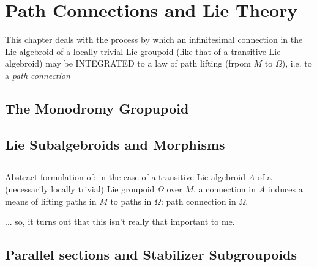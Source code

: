 \chapter{Path Connections and Lie Theory}

This chapter deals with the process by which an infinitesimal connection in the Lie algebroid of a locally trivial Lie groupoid (like that of a transitive Lie algebroid) may be INTEGRATED to a law of path lifting (frpom $M$ to $\Omega$), i.e. to a \emph{path connection}

\section{The Monodromy Gropupoid}

\section{Lie Subalgebroids and Morphisms}

\section{}

Abstract formulation of: in the case of a transitive Lie algebroid $A$ of a (necessarily locally trivial) Lie groupoid $\Omega$ over $M$, a connection in $A$ induces a means of lifting paths in $M$ to paths in $\Omega$: path connection in $\Omega$.

... so, it turns out that this isn't really that important to me.



\section{Parallel sections and Stabilizer Subgroupoids}

